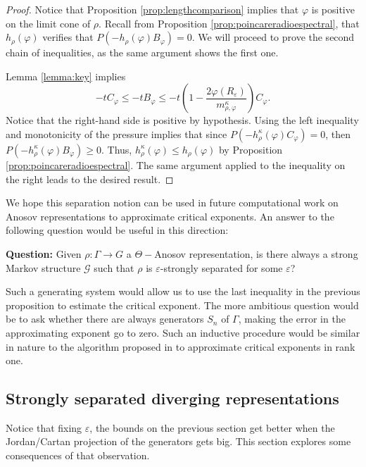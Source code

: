 \documentclass{amsart}
\theoremstyle{remark}
\theoremstyle{definition}
\begin{document}
\begin{proof}
Notice that Proposition \ref{prop:lengthcomparison} implies that $\varphi$ is positive on the limit cone of $\rho$.
Recall from Proposition \ref{prop:poincareradioespectral}, that $h_\rho (\varphi)$ verifies that $P(- h_\rho (\varphi)B_\varphi) = 0$. 
We will proceed to prove the second chain of inequalities, as the same argument shows the first one.

Lemma \ref{lemma:key} implies
$$-t C_\varphi \leq -t B_\varphi \leq -t \left( 1 - \frac{2\varphi (R_\varepsilon)}{m_{\rho,\varphi}^\kappa}\right) C_\varphi.$$
Notice that the right-hand side is positive by hypothesis.
Using the left inequality and monotonicity of the pressure implies that since $P(-h_\rho^\kappa (\varphi) C_\varphi) = 0$, then $P(-h_\rho^\kappa (\varphi) B_\varphi) \geq 0$.
Thus, $h_\rho^\kappa (\varphi) \leq h_\rho (\varphi)$ by Proposition \ref{prop:poincareradioespectral}.
The same argument applied to the inequality on the right leads to the desired result.
\end{proof}

We hope this separation notion can be used in future computational work on Anosov representations to approximate critical exponents.
An answer to the following question would be useful in this direction:

\textbf{Question:} Given $\rho : \Gamma \rightarrow G$ a $\Theta-$Anosov representation, is there always a strong Markov structure $\mathcal{G}$ such that $\rho$ is $\varepsilon$-strongly separated for some $\varepsilon$? 

Such a generating system would allow us to use the last inequality in the previous proposition to estimate the critical exponent.
The more ambitious question would be to ask whether there are always generators $S_n$ of $\Gamma$, making the error in the approximating exponent go to zero.
Such an inductive procedure would be similar in nature to the algorithm proposed in \cite{mcmullen1998hausdorff} to approximate critical exponents in rank one.

\subsection{Strongly separated diverging representations}

Notice that fixing $\varepsilon$, the bounds on the previous section get better when the Jordan/Cartan projection of the generators gets big.
This section explores some consequences of that observation.
\end{document}
